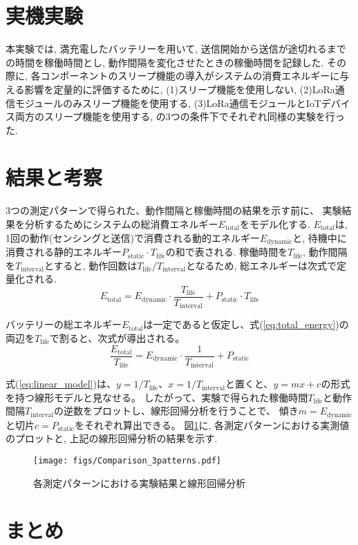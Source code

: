\documentclass[lualatex, twocolumn]{ltjsarticle}
\begin{document}
\section{実機実験}
本実験では, 満充電したバッテリーを用いて, 送信開始から送信が途切れるまでの時間を稼働時間とし,
動作間隔を変化させたときの稼働時間を記録した. 
その際に, 各コンポーネントのスリープ機能の導入がシステムの消費エネルギーに与える影響を定量的に評価するために,
(1)スリープ機能を使用しない, (2)LoRa通信モジュールのみスリープ機能を使用する, (3)LoRa通信モジュールとIoTデバイス両方のスリープ機能を使用する, の3つの条件下でそれぞれ同様の実験を行った.

\section{結果と考察}
 3つの測定パターンで得られた、動作間隔と稼働時間の結果を示す前に、
実験結果を分析するためにシステムの総消費エネルギー$E_{\mathrm{total}}$をモデル化する. 
$E_{\mathrm{total}}$は, 1回の動作(センシングと送信)で消費される動的エネルギー$E_{\mathrm{dynamic}}$と, 
待機中に消費される静的エネルギー$P_{\mathrm{static}}\cdot T_{\mathrm{life}}$の和で表される.
稼働時間を$T_{\mathrm{life}}$, 動作間隔を$T_{\mathrm{interval}}$とすると, 動作回数は$T_{\mathrm{life}}/T_{\mathrm{interval}}$となるため, 総エネルギーは次式で定量化される. 
\begin{equation}
    E_{\mathrm{total}} = E_{{\mathrm{dynamic}}} \cdot \frac{T_{\mathrm{life}}}{T_{\mathrm{interval}}} + P_{\mathrm{static}} \cdot T_{\mathrm{life}}
    \label{eq:total_energy}
\end{equation}

バッテリーの総エネルギー$E_{\mathrm{total}}$は一定であると仮定し、式(\ref{eq:total_energy})の両辺を$T_{\mathrm{life}}$で割ると、次式が導出される。
\begin{equation}
  \frac{E_{\mathrm{total}}}{T_{\mathrm{life}}} = E_{\mathrm{dynamic}} \cdot \frac{1}{T_{\mathrm{interval}}} + {P_{\mathrm{static}}}
  \label{eq:linear_model}
\end{equation}

式(\ref{eq:linear_model})は、$y = 1/T_{\mathrm{life}}$、$x = 1/T_{\mathrm{interval}}$と置くと、$y=mx+c$の形式を持つ線形モデルと見なせる。
したがって、実験で得られた稼働時間$T_{\mathrm{life}}$と動作間隔$T_{\mathrm{interval}}$の逆数をプロットし、線形回帰分析を行うことで、
傾き$m=E_{\mathrm{dynamic}}$と切片$c=P_{\mathrm{static}}$をそれぞれ算出できる。
図\ref{fig:results_and_analysis}に, 各測定パターンにおける実測値のプロットと, 上記の線形回帰分析の結果を示す. 

\begin{figure}[t]
    \centering
    \texttt{[image: figs/Comparison\_3patterns.pdf]}
    \caption{各測定パターンにおける実験結果と線形回帰分析}
    \label{fig:results_and_analysis}
\end{figure}

\section{まとめ}
\end{document}
